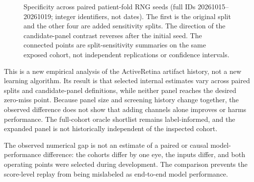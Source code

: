 \documentclass[11pt]{article}
\begin{document}
\begin{figure}[t]
\centering
{}
\caption{Specificity across paired patient-fold RNG seeds (full IDs 20261015--20261019; integer identifiers, not dates). The first is the original split and the other four are added sensitivity splits. The direction of the candidate-panel contrast reverses after the initial seed. The connected points are split-sensitivity summaries on the same exposed cohort, not independent replications or confidence intervals.}
\label{fig:panel-seed-sensitivity}
\end{figure}

This is a new empirical analysis of the ActiveRetina artifact history, not a new learning algorithm. Its result is that selected internal estimates vary across paired splits and candidate-panel definitions, while neither panel reaches the desired zero-miss point. Because panel size and screening history change together, the observed difference does not show that adding channels alone improves or harms performance. The full-cohort oracle shortlist remains label-informed, and the expanded panel is not historically independent of the inspected cohort.

The observed numerical gap is not an estimate of a paired or causal model-performance difference: the cohorts differ by one eye, the inputs differ, and both operating points were selected during development. The comparison prevents the score-level replay from being mislabeled as end-to-end model performance.
\end{document}
